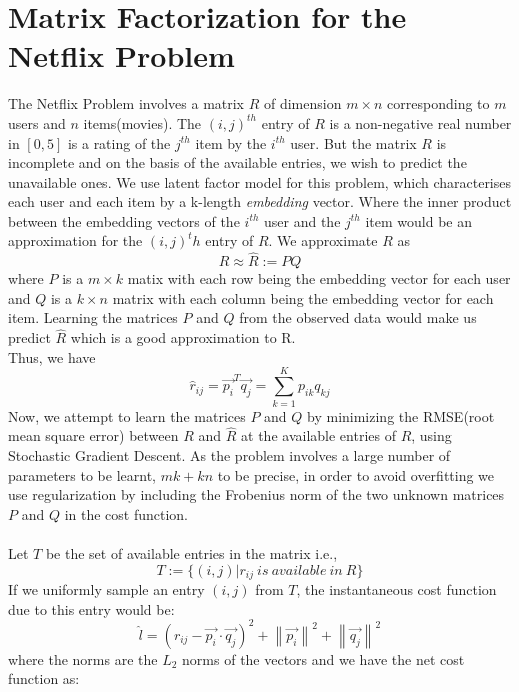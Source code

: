 \documentclass[11pt, english]{article}
\newcommand\norm[1]{\left\lVert#1\right\rVert}
\begin{document}
\section{Matrix Factorization for the Netflix Problem}
The Netflix Problem involves a matrix $R$ of dimension $m \times n$ corresponding to $m$ users and $n$ items(movies). The $(i,j)^{th}$ entry of $R$ is a non-negative real number in $[0,5]$ is a rating of the $j^{th}$ item by the $i^{th}$ user. But the matrix $R$ is incomplete and on the basis of the available entries, we wish to predict the unavailable ones. We use latent factor model for this problem, which characterises each user and each item by a k-length \textit{embedding} vector. Where the inner product between the embedding vectors of the $i^{th}$ user and the $j^{th}$ item would be an approximation for the $(i,j)^th$ entry of $R$. We approximate $R$ as
\begin{equation}
    R\approx \hat{R}:=PQ 
\end{equation}
where $P$ is a $m \times k$ matix with each row being the embedding vector for each user and $Q$ is a $k \times n$ matrix with each column being the embedding vector for each item.
Learning the matrices $P$ and $Q$ from the observed data would make us predict $\hat{R}$ which is a good approximation to R.\\
Thus, we have
\begin{equation}
    \hat{r}_{ij}=\vec{p_{i}}^{T}\vec{q_{j}}=\sum\limits_{k=1}^{K}p_{ik}q_{kj}
\end{equation} 
Now, we attempt to learn the matrices $P$ and $Q$ by minimizing the RMSE(root mean square error) between $R$ and $\hat{R}$ at the available entries of $R$, using Stochastic Gradient Descent. As the problem involves a large number of parameters to be learnt, $mk+kn$ to be precise, in order to avoid overfitting we use regularization by including the Frobenius norm of the two unknown matrices $P$ and $Q$ in the cost function.\\\\
Let $T$ be the set of available entries in the matrix i.e.,
\begin{equation}
    T:=\{(i,j)|r_{ij}~is~available~in~R\}
\end{equation}
 If we uniformly sample an entry $(i,j)$ from $T$, the instantaneous cost function due to this entry would be:
 \begin{equation}
     \hat{l}=(r_{ij}-\vec{p_{i}}\cdot\vec{q_{j}})^2 + \norm{\vec{p_{i}}}^2+\norm{\vec{q_{j}}}^2
 \end{equation}
 where the norms are the $L_2$ norms of the vectors and we have the net cost function as:
 
\end{document}
